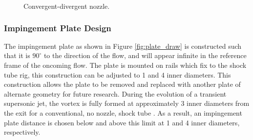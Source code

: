 \begin{figure}[!tbh]
  \centering
  \hfill
  \caption{Convergent-divergent nozzle.}
  \label{fig:con_div_noz}
\end{figure}

\subsubsection{Impingement Plate Design}
The impingement plate as shown in Figure \ref{fig:plate_draw} is constructed such that it is $90^{\circ}$ to the direction of the flow, and will appear infinite in the reference frame of the oncoming flow. The plate is mounted on rails which fix to the shock tube rig, this construction can be adjusted to 1 and 4 inner diameters. This construction allows the plate to be removed and replaced with another plate of alternate geometry for future research. During the evolution of a transient supersonic jet, the vortex is fully formed at approximately 3 inner diameters from the exit for a conventional, no nozzle, shock tube \citep{mariani2013head}. As a result, an impingement plate distance is chosen below and above this limit at 1 and 4 inner diameters, respectively. 

